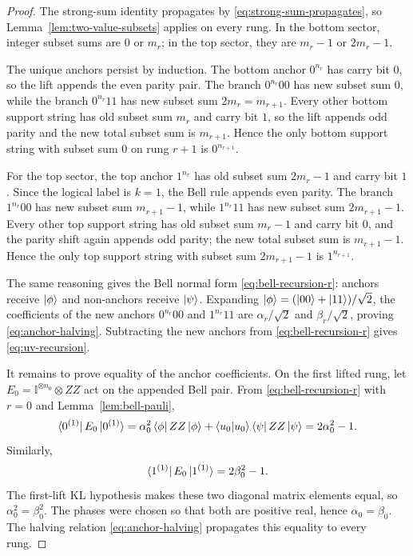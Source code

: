 \documentclass[11pt]{article}
\newcommand{\id}{\mathbb I}
\newcommand{\ketphi}{\ket{\phi}}
\newcommand{\ketpsi}{\ket{\psi}}
\begin{document}
\begin{proof}
The strong-sum identity propagates by \eqref{eq:strong-sum-propagates}, so Lemma~\ref{lem:two-value-subsets}
applies on every rung.  In the bottom sector, integer subset sums are $0$ or $m_r$; in the top
sector, they are $m_r-1$ or $2m_r-1$.

The unique anchors persist by induction.  The bottom anchor $0^{n_r}$ has carry bit $0$, so the
lift appends the even parity pair.  The branch $0^{n_r}00$ has new subset sum $0$, while the
branch $0^{n_r}11$ has new subset sum $2m_r=m_{r+1}$.  Every other bottom support string has old
subset sum $m_r$ and carry bit $1$, so the lift appends odd parity and the new total subset sum
is $m_{r+1}$.  Hence the only bottom support string with subset sum $0$ on rung $r+1$ is
$0^{n_{r+1}}$.

For the top sector, the top anchor $1^{n_r}$ has old subset sum $2m_r-1$ and carry bit $1$.  Since
the logical label is $k=1$, the Bell rule appends even parity.  The branch $1^{n_r}00$ has new
subset sum $m_{r+1}-1$, while $1^{n_r}11$ has new subset sum $2m_{r+1}-1$.  Every other top
support string has old subset sum $m_r-1$ and carry bit $0$, and the parity shift again appends
odd parity; the new total subset sum is $m_{r+1}-1$.  Hence the only top support string with
subset sum $2m_{r+1}-1$ is $1^{n_{r+1}}$.

The same reasoning gives the Bell normal form \eqref{eq:bell-recursion-r}: anchors receive
$\ketphi$ and non-anchors receive $\ketpsi$.  Expanding
$\ketphi=(\ket{00}+\ket{11})/\sqrt2$, the coefficients of the new anchors
$0^{n_r}00$ and $1^{n_r}11$ are $\alpha_r/\sqrt2$ and $\beta_r/\sqrt2$, proving
\eqref{eq:anchor-halving}.  Subtracting the new anchors from \eqref{eq:bell-recursion-r} gives
\eqref{eq:uv-recursion}.

It remains to prove equality of the anchor coefficients.  On the first lifted rung, let
$E_0=\id^{\otimes n_0}\otimes ZZ$ act on the appended Bell pair.  From
\eqref{eq:bell-recursion-r} with $r=0$ and Lemma~\ref{lem:bell-pauli},
\[
  \bra{0^{(1)}}E_0\ket{0^{(1)}}
  =\alpha_0^2\bra{\phi}ZZ\ket{\phi}
  +\braket{u_0|u_0}\bra{\psi}ZZ\ket{\psi}
  =2\alpha_0^2-1.
\]
Similarly,
\[
  \bra{1^{(1)}}E_0\ket{1^{(1)}}=2\beta_0^2-1.
\]
The first-lift KL hypothesis makes these two diagonal matrix elements equal, so
$\alpha_0^2=\beta_0^2$.  The phases were chosen so that both are positive real, hence
$\alpha_0=\beta_0$.  The halving relation \eqref{eq:anchor-halving} propagates this equality to
every rung.
\end{proof}
\end{document}
